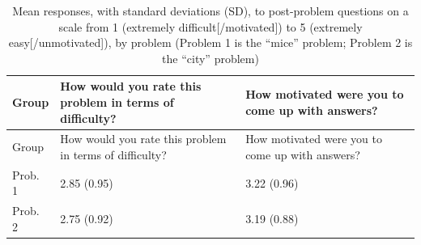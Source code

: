 \documentclass[english,man]{apa6}
\begin{document}
\begin{longtable}[]{@{}lll@{}}
\caption{Mean responses, with standard deviations (SD), to post-problem
questions on a scale from 1 (extremely difficult{[}/motivated{]}) to 5
(extremely easy{[}/unmotivated{]}), by problem (Problem 1 is the
\enquote{mice} problem; Problem 2 is the \enquote{city}
problem)}\tabularnewline
\toprule
\begin{minipage}[b]{0.07\columnwidth}\raggedright
Group\strut
\end{minipage} & \begin{minipage}[b]{0.45\columnwidth}\raggedright
How would you rate this problem in terms of difficulty?\strut
\end{minipage} & \begin{minipage}[b]{0.39\columnwidth}\raggedright
How motivated were you to come up with answers?\strut
\end{minipage}\tabularnewline
\midrule
\endfirsthead
\toprule
\begin{minipage}[b]{0.07\columnwidth}\raggedright
Group\strut
\end{minipage} & \begin{minipage}[b]{0.45\columnwidth}\raggedright
How would you rate this problem in terms of difficulty?\strut
\end{minipage} & \begin{minipage}[b]{0.39\columnwidth}\raggedright
How motivated were you to come up with answers?\strut
\end{minipage}\tabularnewline
\midrule
\endhead
\begin{minipage}[t]{0.07\columnwidth}\raggedright
Prob. 1\strut
\end{minipage} & \begin{minipage}[t]{0.45\columnwidth}\raggedright
2.85 (0.95)\strut
\end{minipage} & \begin{minipage}[t]{0.39\columnwidth}\raggedright
3.22 (0.96)\strut
\end{minipage}\tabularnewline
\begin{minipage}[t]{0.07\columnwidth}\raggedright
Prob. 2\strut
\end{minipage} & \begin{minipage}[t]{0.45\columnwidth}\raggedright
2.75 (0.92)\strut
\end{minipage} & \begin{minipage}[t]{0.39\columnwidth}\raggedright
3.19 (0.88)\strut
\end{minipage}\tabularnewline
\bottomrule
\end{longtable}
\end{document}
